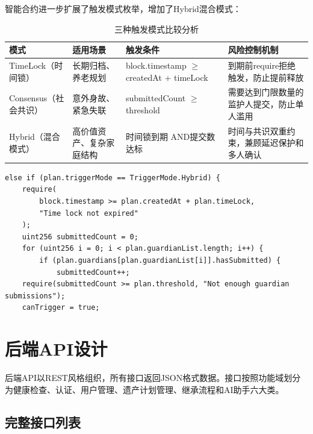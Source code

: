\documentclass[UTF8,a4paper,zihao=-4,openany]{ctexrep}
\begin{document}
智能合约进一步扩展了触发模式枚举，增加了Hybrid混合模式：

\begin{table}[htbp]
\centering
\caption{三种触发模式比较分析}
\begin{tabularx}{\textwidth}{p{2.8cm}p{3.5cm}p{4cm}X}
\toprule
模式 & 适用场景 & 触发条件 & 风险控制机制\\
\midrule
TimeLock（时间锁） & 长期归档、养老规划 & block.timestamp $\ge$ createdAt + timeLock & 到期前require拒绝触发，防止提前释放\\
Consensus（社会共识） & 意外身故、紧急失联 & submittedCount $\ge$ threshold & 需要达到门限数量的监护人提交，防止单人滥用\\
Hybrid（混合模式） & 高价值资产、复杂家庭结构 & 时间锁到期 AND提交数达标 & 时间与共识双重约束，兼顾延迟保护和多人确认\\
\bottomrule
\end{tabularx}
\end{table}

\begin{lstlisting}[style=solidity,caption={Hybrid模式触发逻辑 (LegacyContract.sol:141-154, 节选)}] else if (plan.triggerMode == TriggerMode.Hybrid) {
    require(
        block.timestamp >= plan.createdAt + plan.timeLock,
        "Time lock not expired"
    );
    uint256 submittedCount = 0;
    for (uint256 i = 0; i < plan.guardianList.length; i++) {
        if (plan.guardians[plan.guardianList[i]].hasSubmitted) {
            submittedCount++;
    require(submittedCount >= plan.threshold, "Not enough guardian submissions");
    canTrigger = true;
\end{lstlisting}

\section{后端API设计}

后端API以REST风格组织，所有接口返回JSON格式数据。接口按照功能域划分为健康检查、认证、用户管理、遗产计划管理、继承流程和AI助手六大类。

\subsection{完整接口列表}
\end{document}
